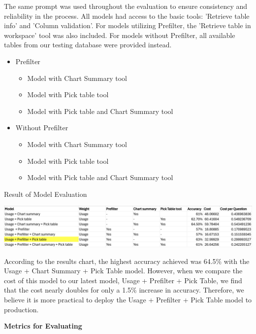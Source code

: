     The same prompt was used throughout the evaluation to ensure consistency and reliability in the process. All models had access to the basic tools: 'Retrieve table info' and 'Column validation'. For models utilizing Prefilter, the 'Retrieve table in workspace' tool was also included. For models without Prefilter, all available tables from our testing database were provided instead.
    \begin{itemize}
        \item Prefilter
        \begin{itemize}
            \item Model with Chart Summary tool
            \item Model with Pick table tool
            \item Model with Pick table and Chart Summary tool
        \end{itemize}
        \item Without Prefilter
        \begin{itemize}
            \item Model with Chart Summary tool
            \item Model with Pick table tool
            \item Model with Pick table and Chart Summary tool
        \end{itemize}
    \end{itemize}
    \begin{table}[H]
        \centering
        \caption[Result of Model Evaluation]{Result of Model Evaluation}
        \label{fig:generate_result}
        \includegraphics[width=17cm]{chapters/4/figures/generate_result.png}
    \end{table}
    According to the results chart, the highest accuracy achieved was 64.5\% with the Usage + Chart Summary + Pick Table model. However, when we compare the cost of this model to our latest model, Usage + Prefilter + Pick Table, we find that the cost nearly doubles for only a 1.5\% increase in accuracy. Therefore, we believe it is more practical to deploy the Usage + Prefilter + Pick Table model to production.
    \vspace{0.5cm}


    \textbf{Metrics for Evaluating}


